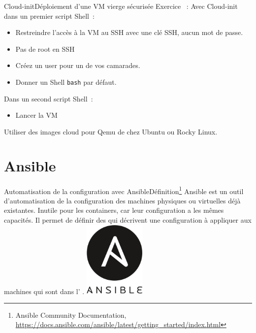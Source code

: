 \documentclass{beamer}
\begin{document}
    \begin{frame}{Cloud-init}{Déploiement d'une VM vierge sécurisée}
        Exercice \execcounterdispinc{}~:
        Avec Cloud-init dans un premier script Shell~:
        \begin{itemize}
            \item Restreindre l'accès à la VM au SSH avec une clé SSH, aucun mot de passe.
            \item Pas de root en SSH
            \item Créez un user pour un de vos camarades.
            \item Donner un Shell \lstinline{bash} par défaut.
        \end{itemize}
        Dans un second script Shell~:
        \begin{itemize}
            \item Lancer la VM
        \end{itemize}
        Utiliser des images cloud pour Qemu de chez Ubuntu ou Rocky Linux.
    \end{frame}


    \section{Ansible}\label{sec:ansible}

    \begin{frame}{Automatisation de la configuration avec Ansible}{Définition\footnote{Ansible Community Documentation, \url{https://docs.ansible.com/ansible/latest/getting_started/index.html}}}
        Ansible est un outil d'automatisation de la configuration des machines physiques ou virtuelles déjà existantes.
        Inutile pour les containers, car leur configuration a les mêmes capacités.
        Il permet de définir des  qui décrivent une configuration à appliquer aux machines qui sont dans l' .
        \bigbreak
        \centering
        \includegraphics[width=3cm]{image/logo-ansible}
    \end{frame}
\end{document}
